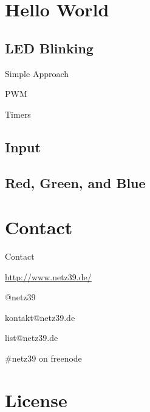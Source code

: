 \documentclass{beamer}
\begin{document}
\section{Hello World}

\subsection{LED Blinking}

\begin{frame}{Simple Approach}
\end{frame}

\begin{frame}{PWM}
\end{frame}

\begin{frame}{Timers}
\end{frame}

\subsection{Input}

\subsection{Red, Green, and Blue}

\section{Contact}

\begin{frame}{Contact}
    \begin{center}
        \begin{description}
            \item[WWW] \url{http://www.netz39.de/}
            \item[Twitter/identi.ca] @netz39
            \item[E-Mail] kontakt@netz39.de
            \item[Mailingliste] list@netz39.de
            \item[IRC] \#netz39 on freenode
        \end{description}
    \end{center}
\end{frame}

\appendix

\section{License}
\end{document}
